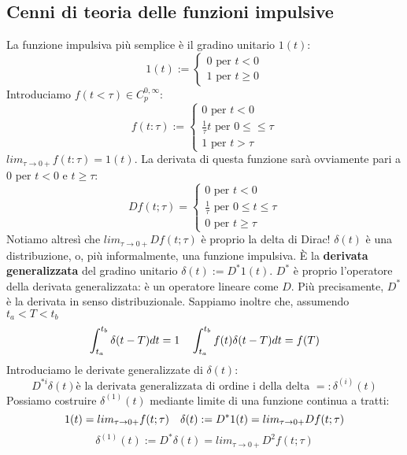 \documentclass[11pt]{article}
\begin{document}
\subsection{Cenni di teoria delle funzioni impulsive}
La funzione impulsiva più semplice è il gradino unitario $1(t)$:
\begin{displaymath}
    1(t) := \begin{cases}
        0 \textrm{ per }t<0\\
        1 \textrm{ per }t\ge0
    \end{cases}
\end{displaymath}
Introduciamo $f(t<\tau) \in C_p^{0,\infty}$:
\begin{displaymath}
    f(t:\tau) :=
    \begin{cases}
        0 \textrm{ per } t<0\\
        \frac{1}{\tau} t \textrm{ per }0\le \le \tau\\
        1 \textrm{ per }t>\tau
    \end{cases}
\end{displaymath}
$lim_{\tau \rightarrow 0+} f(t:\tau) = 1(t)$.
La derivata di questa funzione sarà ovviamente pari a 0 per $t<0$ e $t\ge\tau$:
\begin{displaymath}
    Df(t;\tau) = 
    \begin{cases}
        0 \textrm{ per } t<0\\
        \frac{1}{\tau} \textrm{ per } 0\le t \le \tau\\
        0 \textrm{ per }t\ge\tau
    \end{cases}
\end{displaymath}
Notiamo altresì che $lim_{\tau\rightarrow 0+} Df(t;\tau)$ è proprio la delta di Dirac!
$\delta(t)$ è una distribuzione, o, più informalmente, una funzione impulsiva. È la \textbf{derivata generalizzata} del gradino unitario $\delta(t) := D^*1(t)$. $D^*$ è proprio l'operatore della derivata generalizzata: è un operatore lineare come $D$. Più precisamente, $D^*$ è la derivata in senso distribuzionale. Sappiamo inoltre che, assumendo $t_a < T < t_b$ 
\begin{displaymath}
    \int_{t_a}^{t_b} \delta(t-T)dt = 1 \hspace{10px} \int_{t_a}^{t_b} f(t)\delta(t-T)dt = f(T) 
\end{displaymath}
Introduciamo le derivate generalizzate di $\delta(t)$:
\begin{displaymath}
    D^{*i}\delta(t) \textrm{è la derivata generalizzata di ordine i della delta } =: \delta^{(i)}(t)
\end{displaymath}
Possiamo costruire $\delta^{(1)}(t)$ mediante limite di una funzione continua a tratti:
\begin{displaymath}
    1(t) = lim_{\tau\rightarrow0+}f(t;\tau) \hspace{10px} \delta(t):= D^* 1(t) = lim_{\tau\rightarrow0+} Df(t;\tau)
\end{displaymath}
\begin{displaymath}
    \delta^{(1)} (t) := D^* \delta(t) = lim_{\tau\rightarrow0+}D^2 f(t;\tau)
\end{displaymath}
\end{document}
